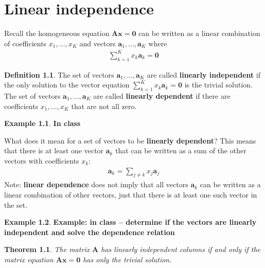 \documentclass[
]{book}
\newtheorem{theorem}{Theorem}[chapter]
\theoremstyle{definition}
\newtheorem{definition}{Definition}[chapter]
\theoremstyle{definition}
\newtheorem{example}{Example}[chapter]
\theoremstyle{definition}
\theoremstyle{definition}
\theoremstyle{remark}
\begin{document}
\hypertarget{linear-independence}{%
\chapter{Linear independence}\label{linear-independence}}

Recall the homogeneous equation \(\mathbf{A} \mathbf{x} = \mathbf{0}\) can be written as a linear combination of coefficients \(x_1, \ldots, x_K\) and vectors \(\mathbf{a}_1, \ldots, \mathbf{a}_K\) where
\[
\begin{aligned}
\sum_{k=1}^K x_k \mathbf{a}_k = \mathbf{0}
\end{aligned}
\]

\begin{definition}
The set of vectors \(\mathbf{a}_1, \ldots, \mathbf{a}_K\) are called \textbf{linearly independent} if the only solution to the vector equation \(\sum_{k=1}^K x_k \mathbf{a}_k = \mathbf{0}\) is the trivial solution. The set of vectors \(\mathbf{a}_1, \ldots, \mathbf{a}_K\) are called \textbf{linearly dependent} if there are coefficients \(x_1, \ldots, x_K\) that are not all zero.
\end{definition}

\begin{example}
\textbf{In class}
\end{example}

What does it mean for a set of vectors to be \textbf{linearly dependent}? This means that there is at least one vector \(\mathbf{a}_k\) that can be written as a sum of the other vectors with coefficients \(x_k\):
\[
\begin{aligned}
\mathbf{a}_k = \sum_{j \neq k} x_{j} \mathbf{a}_{j}
\end{aligned}
\]
Note: \textbf{linear dependence} does not imply that all vectors \(\mathbf{a}_{k}\) can be written as a linear combination of other vectors, just that there is at least one such vector in the set.

\begin{example}
\textbf{Example: in class -- determine if the vectors are linearly independent and solve the dependence relation}
\end{example}

\begin{theorem}
The matrix \(\mathbf{A}\) has linearly independent columns if and only if the matrix equation \(\mathbf{A}\mathbf{x} = \mathbf{0}\) has only the trivial solution.
\end{theorem}
\end{document}

